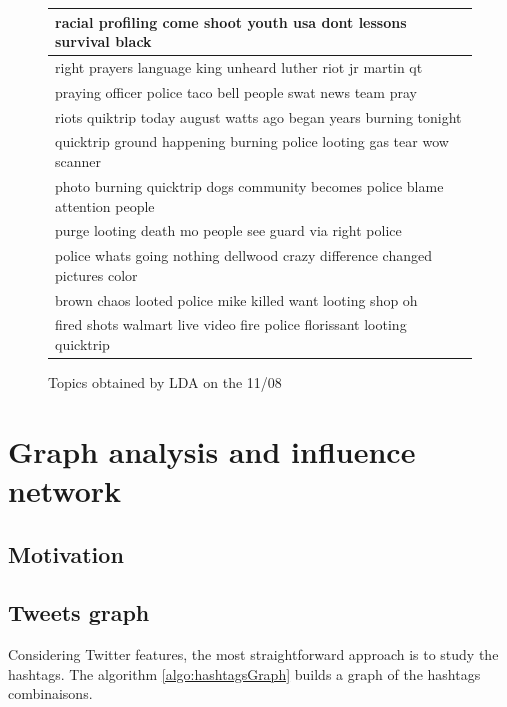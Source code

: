 \documentclass[a4paper,12pt]{report}
\begin{document}
\begin{figure}[H]
  \centering
\begin{tabular}{l}
\hline
racial profiling come shoot youth usa dont lessons survival black \\ \hline
right prayers language king unheard luther riot jr martin qt \\ \hline
praying officer police taco bell people swat news team pray \\ \hline
riots quiktrip today august watts ago began years burning tonight \\ \hline
quicktrip ground happening burning police looting gas tear wow scanner \\ \hline
photo burning quicktrip dogs community becomes police blame attention people \\ \hline
purge looting death mo people see guard via right police \\ \hline
police whats going nothing dellwood crazy difference changed pictures color \\ \hline
brown chaos looted police mike killed want looting shop oh \\ \hline
fired shots walmart live video fire police florissant looting quicktrip \\ \hline
\end{tabular}
\caption{Topics obtained by LDA on the 11/08}
\end{figure}

\newpage



\chapter{Graph analysis and influence network}

\section{Motivation}

\newpage
\section{Tweets graph}
Considering Twitter features, the most straightforward approach is to study the hashtags. The algorithm \ref{algo:hashtagsGraph} builds a graph of the hashtags combinaisons.
\end{document}
